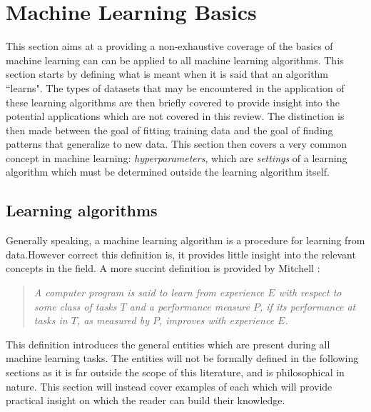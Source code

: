 \newpage


\section{Machine Learning Basics}
This section aims at a providing a non-exhaustive coverage of the basics of
machine learning can can be applied to all machine learning algorithms. This
section starts by defining what is meant when it is said that an algorithm
``learns". The types of datasets that may be encountered in the application of
these learning algorithms are then briefly covered to provide insight into the
potential applications which are not covered in this review. The distinction is
then made between the goal of fitting training data and the goal of finding
patterns that generalize to new data. This section then covers a very common
concept in machine learning: \textit{hyperparameters}, which are
\textit{settings} of a learning algorithm which must be determined outside the
learning algorithm itself.

\subsection{Learning algorithms}
Generally speaking, a machine learning algorithm is a procedure for learning
from data.However correct this definition is, it provides little insight into
the relevant concepts in the field. A more succint definition is provided by
Mitchell \cite{Mitchell97LearningAlgorithm}:
\begin{quotation}
    \textit{
        A computer program is said to learn from experience $E$ with respect to
        some class of tasks $T$ and a performance measure $P$, if its
        performance at tasks in $T$, as measured by $P$, improves with
        experience $E$.
    }
\end{quotation}
This definition introduces the general entities which are present during all
machine learning tasks. The entities will not be formally defined in the
following sections as it is far outside the scope of this literature, and is
philosophical in nature. This section will instead cover examples of each which
will provide practical insight on which the reader can build their knowledge.

